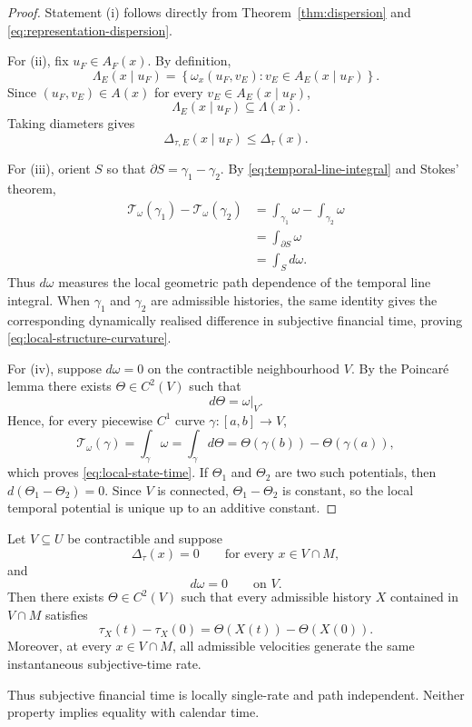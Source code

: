 \documentclass[graybox,natbib]{SNmult}
\providecommand{\1}{}
\renewcommand{\1}{\mathbbm 1}
\begin{document}
\begin{proof}

Statement (i) follows directly from
Theorem~\ref{thm:dispersion} and
\eqref{eq:representation-dispersion}.

For (ii), fix \(u_F\in A_F(x)\). By definition,
\[
\Lambda_E(x\mid u_F)
=
\left\{
\omega_x(u_F,v_E):
v_E\in A_E(x\mid u_F)
\right\}.
\]
Since \((u_F,v_E)\in A(x)\) for every
\(v_E\in A_E(x\mid u_F)\),
\[
\Lambda_E(x\mid u_F)\subseteq\Lambda(x).
\]
Taking diameters gives
\[
\Delta_{\tau,E}(x\mid u_F)
\leq
\Delta_\tau(x).
\]

For (iii), orient \(S\) so that
\(\partial S=\gamma_1-\gamma_2\). By
\eqref{eq:temporal-line-integral} and Stokes' theorem,
\[
\begin{aligned}
\mathcal T_\omega(\gamma_1)
-
\mathcal T_\omega(\gamma_2)
&=
\int_{\gamma_1}\omega-\int_{\gamma_2}\omega \\
&=
\int_{\partial S}\omega \\
&=
\int_S d\omega.
\end{aligned}
\]
Thus \(d\omega\) measures the local geometric path dependence of the temporal
line integral. When \(\gamma_1\) and \(\gamma_2\) are admissible histories,
the same identity gives the corresponding dynamically realised difference in
subjective financial time, proving
\eqref{eq:local-structure-curvature}.

For (iv), suppose \(d\omega=0\) on the contractible neighbourhood \(V\).
By the Poincar\'e lemma there exists
\(\Theta\in C^2(V)\) such that
\[
d\Theta=\omega|_V.
\]
Hence, for every piecewise \(C^1\) curve
\(\gamma:[a,b]\to V\),
\[
\mathcal T_\omega(\gamma)
=
\int_\gamma\omega
=
\int_\gamma d\Theta
=
\Theta(\gamma(b))-\Theta(\gamma(a)),
\]
which proves \eqref{eq:local-state-time}. If
\(\Theta_1\) and \(\Theta_2\) are two such potentials, then
\(d(\Theta_1-\Theta_2)=0\). Since \(V\) is connected,
\(\Theta_1-\Theta_2\) is constant, so the local temporal potential is unique
up to an additive constant.
\end{proof}


\begin{corollary}
\label{cor:unique-path-independent-time}

Let \(V\subseteq U\) be contractible and suppose
\[
\Delta_\tau(x)=0
\qquad
\text{for every }x\in V\cap M,
\]
and
\[
d\omega=0
\qquad
\text{on }V.
\]
Then there exists \(\Theta\in C^2(V)\) such that every admissible history
\(X\) contained in \(V\cap M\) satisfies
\begin{equation}
\tau_X(t)-\tau_X(0)
=
\Theta(X(t))-\Theta(X(0)).
\label{eq:unique-path-independent-time}
\end{equation}
Moreover, at every \(x\in V\cap M\), all admissible velocities generate the
same instantaneous subjective-time rate.

Thus subjective financial time is locally single-rate and path independent.
Neither property implies equality with calendar time.
\end{corollary}
\end{document}
